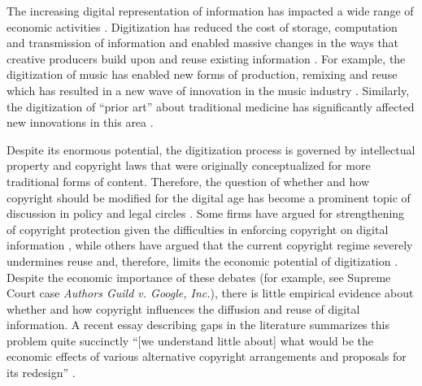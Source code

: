 \documentclass[11pt]{article}
\begin{document}
The increasing digital representation of information has impacted a wide range of economic activities \citep{greenstein_digitization_2013}. Digitization has reduced the cost of storage, computation and transmission of information and enabled massive changes in the ways that creative producers build upon and reuse existing information  \citep{goldfarb_introduction_2014}. For example, the digitization of music has enabled new forms of production, remixing and reuse which has resulted in a new wave of innovation in the music industry \citep{waldfogel_digitization_2014}. Similarly, the digitization of ``prior art'' about traditional medicine has significantly affected new innovations in this area \citep{choudhury_ex-ante_2015}. 



Despite its enormous potential, the digitization process is governed by intellectual property and copyright laws that were originally conceptualized for more traditional forms of content. Therefore, the question of whether and how copyright should be modified for the digital age has become a prominent topic of discussion in policy and legal circles \citep{merges_intellectual_2012}. Some firms have argued for strengthening of copyright protection given the difficulties in enforcing copyright on digital information \citep{anderson_new_2007}, while others have argued that the current copyright regime severely undermines reuse and, therefore, limits the economic potential of digitization \citep{samuelson_intellectual_1999, lessig_free_2004}. Despite the economic importance of these debates (for example, see Supreme Court case \emph{Authors Guild v. Google, Inc.}), there is little empirical evidence about whether and how copyright influences the diffusion and reuse of digital information. A recent essay describing gaps in the literature summarizes this problem quite succinctly ``[we understand little about] what would be the economic effects of various alternative copyright arrangements and proposals for its redesign'' \citep{greenstein_digitization_2013}.
\end{document}
